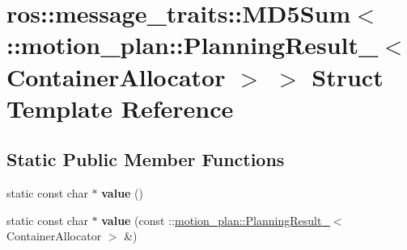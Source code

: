 \hypertarget{structros_1_1message__traits_1_1MD5Sum_3_01_1_1motion__plan_1_1PlanningResult___3_01ContainerAllocator_01_4_01_4}{}\section{ros\+:\+:message\+\_\+traits\+:\+:M\+D5\+Sum$<$ \+:\+:motion\+\_\+plan\+:\+:Planning\+Result\+\_\+$<$ Container\+Allocator $>$ $>$ Struct Template Reference}
\label{structros_1_1message__traits_1_1MD5Sum_3_01_1_1motion__plan_1_1PlanningResult___3_01ContainerAllocator_01_4_01_4}
\subsection*{Static Public Member Functions}
\begin{DoxyCompactItemize}
\item 
\mbox{\label{structros_1_1message__traits_1_1MD5Sum_3_01_1_1motion__plan_1_1PlanningResult___3_01ContainerAllocator_01_4_01_4_a1e56bb30dabfc0c3cf7c58ea0fbfeb2b}} 
static const char $\ast$ {\bfseries value} ()
\item 
\mbox{\label{structros_1_1message__traits_1_1MD5Sum_3_01_1_1motion__plan_1_1PlanningResult___3_01ContainerAllocator_01_4_01_4_a4bf7e15a1ba21216f4dbe41eb98dc177}} 
static const char $\ast$ {\bfseries value} (const \+::\hyperlink{structmotion__plan_1_1PlanningResult__}{motion\+\_\+plan\+::\+Planning\+Result\+\_\+}$<$ Container\+Allocator $>$ \&)
\end{DoxyCompactItemize}

